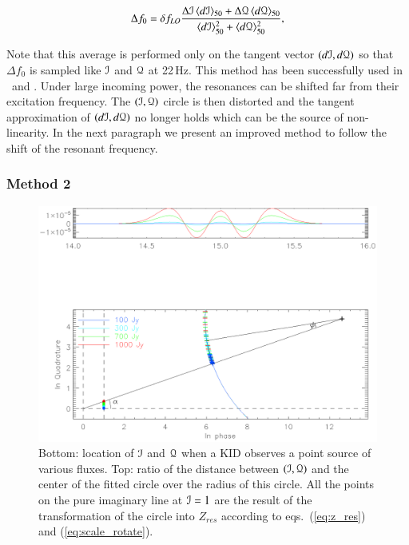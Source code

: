 \begin{equation}
\label{eq:Rf}
\Delta f_{0} = \delta f_{LO} \frac{\Delta \mathcal{I}\, \langle d\mathcal{I}
  \rangle_{50}
+ \Delta \mathcal{Q}\, \langle d\mathcal{Q} \rangle_{50}}{\langle d\mathcal{I}
  \rangle_{50}^{2}
 + \langle d\mathcal{Q} \rangle_{50}^{2}},
\end{equation}

Note that this average is performed only on the tangent vector $(d\mathcal{I},d\mathcal{Q})$ so
that $\Delta f_0$ is sampled like $\mathcal{I}$ and $\mathcal{Q}$ at 22\,Hz. This method has been
successfully used in \nika\ and . Under large incoming power, the resonances can be shifted far from their excitation frequency. The $(\mathcal{I}, \mathcal{Q})$ circle is then distorted and the tangent approximation of $(d\mathcal{I}, d\mathcal{Q})$ no longer holds which can be the source of non-linearity. In the next paragraph we present an improved method to follow the shift of the resonant frequency.

\subsubsection{Method 2}

\begin{figure}
\includegraphics[clip, angle=0, width=\columnwidth]{Figures/circle_zres.eps}
\caption{Bottom: location of $\mathcal{I}$ and $\mathcal{Q}$ when a KID observes a point source of
  various fluxes. Top: ratio of the distance between $(\mathcal{I},\mathcal{Q})$ and the center of
  the fitted circle over the radius of this circle. All the points on the pure
  imaginary line at $\mathcal{I}=1$ are the result of the transformation of the circle
  into $Z_{res}$ according to eqs.~(\ref{eq:z_res}) and
  (\ref{eq:scale_rotate}).}
\label{fig:circle_zres}
\end{figure}

